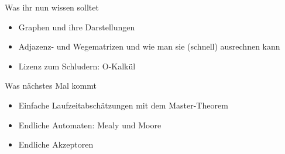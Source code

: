 

\begin{frame}	
	\begin{block}{Was ihr nun wissen solltet}
		\begin{itemize}
			\item Graphen und ihre Darstellungen
			\item Adjazenz- und Wegematrizen und wie man sie (schnell) ausrechnen kann
			\item Lizenz zum Schludern: O-Kalkül
		\end{itemize}
	\end{block}
	
	\begin{block}{Was nächstes Mal kommt}
		\begin{itemize}
			\item Einfache Laufzeitabschätzungen mit dem Master-Theorem
			\item Endliche Automaten: Mealy und Moore
			\item Endliche Akzeptoren
		\end{itemize}
	\end{block}
\end{frame}


\slideThanks

